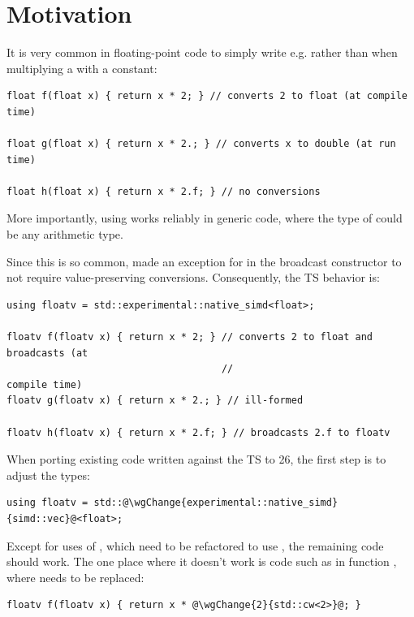 \pagestyle{scrheadings}




\section{Motivation}

It is very common in floating-point code to simply write e.g.  rather than 
when multiplying a  with a constant:
\medskip\begin{lstlisting}[style=Vc]
float f(float x) { return x * 2; } // converts 2 to float (at compile time)

float g(float x) { return x * 2.; } // converts x to double (at run time)

float h(float x) { return x * 2.f; } // no conversions
\end{lstlisting}

More importantly, using  works reliably in generic code, where the type of  could
be any arithmetic type.

Since this is so common,  made an exception for  in the
broadcast constructor to not require value-preserving conversions.
Consequently, the TS behavior is:
\medskip\begin{lstlisting}[style=Vc]
using floatv = std::experimental::native_simd<float>;

floatv f(floatv x) { return x * 2; } // converts 2 to float and broadcasts (at
                                     //                               compile time)
floatv g(floatv x) { return x * 2.; } // ill-formed

floatv h(floatv x) { return x * 2.f; } // broadcasts 2.f to floatv
\end{lstlisting}

When porting existing code written against the TS to \CC{}26, the first step is to adjust the types:
\medskip\begin{lstlisting}
using floatv = std::@\wgChange{experimental::native_simd}{simd::vec}@<float>;
\end{lstlisting}
Except for uses of , which need to be refactored to use
, the remaining code should work.
The one place where it doesn't work is code such as in function , where  needs to be
replaced:
\medskip\begin{lstlisting}[style=Vc]
floatv f(floatv x) { return x * @\wgChange{2}{std::cw<2>}@; }
\end{lstlisting}

